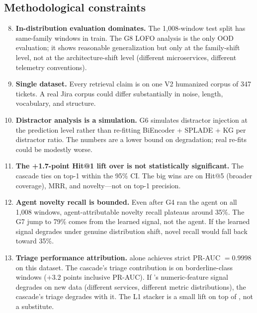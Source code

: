 \subsection{Methodological constraints}

\begin{enumerate}
\setcounter{enumi}{7}
\item \textbf{In-distribution evaluation dominates.} The 1{,}008-window test split has same-family windows in train. The G8 LOFO analysis is the only OOD evaluation; it shows reasonable generalization but only at the family-shift level, not at the architecture-shift level (different microservices, different telemetry conventions).

\item \textbf{Single dataset.} Every retrieval claim is on one V2 humanized corpus of 347 tickets. A real Jira corpus could differ substantially in noise, length, vocabulary, and structure.

\item \textbf{Distractor analysis is a simulation.} G6 simulates distractor injection at the prediction level rather than re-fitting BiEncoder + SPLADE + KG per distractor ratio. The numbers are a lower bound on degradation; real re-fits could be modestly worse.

\item \textbf{The +1.7-point Hit@1 lift over \bienc{} is not statistically significant.} The cascade ties \bienc{} on top-1 within the 95\% CI. The big wins are on Hit@5 (broader coverage), MRR, and novelty---not on top-1 precision.

\item \textbf{Agent novelty recall is bounded.} Even after G4 ran the agent on all 1{,}008 windows, agent-attributable novelty recall plateaus around 35\%. The G7 jump to 79\% comes from the learned signal, not the agent. If the learned signal degrades under genuine distribution shift, novel recall would fall back toward 35\%.

\item \textbf{Triage performance attribution.} \hgb{} alone achieves strict PR-AUC $= 0.9998$ on this dataset. The cascade's triage contribution is on borderline-class windows ($+3.2$ points inclusive PR-AUC). If \hgb{}'s numeric-feature signal degrades on new data (different services, different metric distributions), the cascade's triage degrades with it. The L1 stacker is a small lift on top of \hgb{}, not a substitute.
\end{enumerate}

